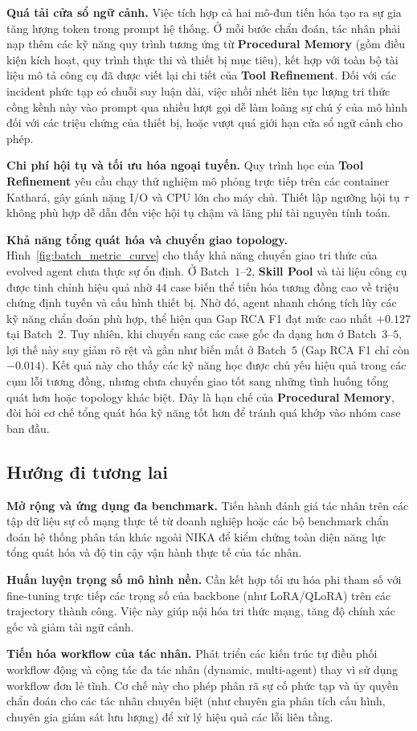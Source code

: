 \noindent\textbf{Quá tải cửa sổ ngữ cảnh.} Việc tích hợp cả hai mô-đun tiến hóa tạo ra sự gia tăng lượng token trong prompt hệ thống. Ở mỗi bước chẩn đoán, tác nhân phải nạp thêm các kỹ năng quy trình tương ứng từ \textbf{Procedural Memory} (gồm điều kiện kích hoạt, quy trình thực thi và thiết bị mục tiêu), kết hợp với toàn bộ tài liệu mô tả công cụ đã được viết lại chi tiết của \textbf{Tool Refinement}. Đối với các incident phức tạp có chuỗi suy luận dài, việc nhồi nhét liên tục lượng tri thức cồng kềnh này vào prompt qua nhiều lượt gọi dễ làm loãng sự chú ý của mô hình đối với các triệu chứng của thiết bị, hoặc vượt quá giới hạn cửa sổ ngữ cảnh cho phép.

\noindent\textbf{Chi phí hội tụ và tối ưu hóa ngoại tuyến.} Quy trình học của \textbf{Tool Refinement} yêu cầu chạy thử nghiệm mô phỏng trực tiếp trên các container Kathará, gây gánh nặng I/O và CPU lớn cho máy chủ. Thiết lập ngưỡng hội tụ $\tau$ không phù hợp dễ dẫn đến việc hội tụ chậm và lãng phí tài nguyên tính toán.

\noindent\textbf{Khả năng tổng quát hóa và chuyển giao topology.} Hình~\ref{fig:batch_metric_curve} cho thấy khả năng chuyển giao tri thức của evolved agent chưa thực sự ổn định. Ở Batch~$1$--$2$, \textbf{Skill Pool} và tài liệu công cụ được tinh chỉnh hiệu quả nhờ $44$ case biến thể tiến hóa tương đồng cao về triệu chứng định tuyến và cấu hình thiết bị. Nhờ đó, agent nhanh chóng tích lũy các kỹ năng chẩn đoán phù hợp, thể hiện qua Gap RCA F1 đạt mức cao nhất $+0.127$ tại Batch~$2$. Tuy nhiên, khi chuyển sang các case gốc đa dạng hơn ở Batch~$3$--$5$, lợi thế này suy giảm rõ rệt và gần như biến mất ở Batch~$5$ (Gap RCA F1 chỉ còn $-0.014$). Kết quả này cho thấy các kỹ năng học được chủ yếu hiệu quả trong các cụm lỗi tương đồng, nhưng chưa chuyển giao tốt sang những tình huống tổng quát hơn hoặc topology khác biệt. Đây là hạn chế của \textbf{Procedural Memory}, đòi hỏi cơ chế tổng quát hóa kỹ năng tốt hơn để tránh quá khớp vào nhóm case ban đầu.

\newpage

\subsection{Hướng đi tương lai}

\noindent\textbf{Mở rộng và ứng dụng đa benchmark.} Tiến hành đánh giá tác nhân trên các tập dữ liệu sự cố mạng thực tế từ doanh nghiệp hoặc các bộ benchmark chẩn đoán hệ thống phân tán khác ngoài NIKA để kiểm chứng toàn diện năng lực tổng quát hóa và độ tin cậy vận hành thực tế của tác nhân.

\noindent\textbf{Huấn luyện trọng số mô hình nền.} Cần kết hợp tối ưu hóa phi tham số với fine-tuning trực tiếp các trọng số của backbone (như LoRA/QLoRA) trên các trajectory thành công. Việc này giúp nội hóa tri thức mạng, tăng độ chính xác gốc và giảm tải ngữ cảnh.

\noindent\textbf{Tiến hóa workflow của tác nhân.} Phát triển các kiến trúc tự điều phối workflow động và cộng tác đa tác nhân (dynamic, multi-agent) thay vì sử dụng workflow đơn lẻ tĩnh. Cơ chế này cho phép phân rã sự cố phức tạp và ủy quyền chẩn đoán cho các tác nhân chuyên biệt (như chuyên gia phân tích cấu hình, chuyên gia giám sát lưu lượng) để xử lý hiệu quả các lỗi liên tầng.

